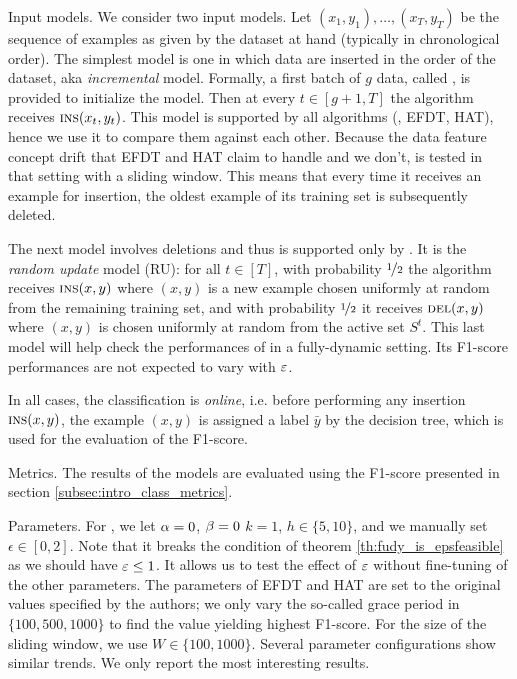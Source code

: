 \begin{paragraph}{Input models.} We consider two input models. Let $(x_1,y_1), \dots ,(x_T,y_T)$ be the sequence of examples as given by the dataset at hand (typically in chronological order). The simplest model is one in which data are inserted in the order of the dataset, aka \emph{incremental} model. Formally, a first batch of $g$ data, called , is provided to initialize the model. Then at every $t \in [g+1, T]$ the algorithm receives $\textsc{ins}(x_t,y_t)$. This model is supported by all algorithms (\algo{}, EFDT, HAT), hence we use it to compare them against each other. Because the data feature concept drift that EFDT and HAT claim to handle and we don't, \algo{} is tested in that setting with a sliding window. This means that every time it receives an example for insertion, the oldest example of its training set is subsequently deleted.

The next model involves deletions and thus is supported only by \algo{}. It is the \emph{random update} model (RU): for all $t \in [T]$, with probability $\nicefrac12$ the algorithm receives $\textsc{ins}(x,y)$ where $(x, y)$ is a new example chosen uniformly at random from the remaining training set, and with probability $\nicefrac12$ it receives $\textsc{del}(x,y)$ where $(x,y)$ is chosen uniformly at random from the active set $S^t$. This last model will help check the performances of \algo{} in a fully-dynamic setting. Its F1-score performances are not expected to vary with $\varepsilon$. 

In all cases, the classification is \emph{online}, i.e. before performing any insertion $\textsc{ins}(x,y)$, the example $(x,y)$ is assigned a label $\bar{y}$ by the decision tree, which is used for the evaluation of the F1-score. 
\end{paragraph}

\begin{paragraph}{Metrics.}
    The results of the models are evaluated using the F1-score presented in section \ref{subsec:intro_class_metrics}. 
\end{paragraph} 

\begin{paragraph}{Parameters.} 
For \algo{}, we let $\alpha = 0$, $\beta = 0$ $k = 1$, $h \in \{5,10\}$, and we manually set $\epsilon \in [0,2]$. Note that it breaks the condition of theorem \ref{th:fudy_is_epsfeasible} as we should have $\varepsilon \leq 1$. It allows us to test the effect of $\varepsilon$ without fine-tuning of the other parameters.
The parameters of EFDT and HAT are set to the original values specified by the authors; we only vary the so-called grace period in $\{100, 500, 1000\}$ to find the value yielding highest F1-score. For the size of the sliding window, we use $W\in\{100,1000\}$. Several parameter configurations show similar trends. We only report the most interesting results.
\end{paragraph}

